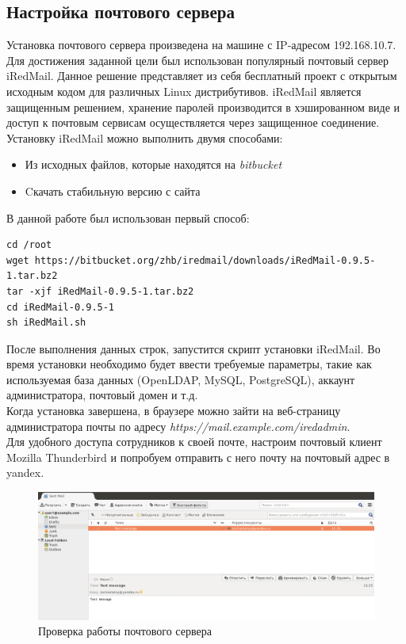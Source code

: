 \subsection{Настройка почтового сервера}
Установка почтового сервера произведена на машине с IP-адресом 192.168.10.7. Для достижения заданной цели был использован популярный почтовый сервер iRedMail. Данное решение представляет из себя бесплатный проект с открытым исходным кодом для различных Linux дистрибутивов. iRedMail является защищенным решением, хранение паролей производится в хэшированном виде и доступ к почтовым сервисам осуществляется через защищенное соединение.\\
Установку iRedMail можно выполнить двумя способами:
\begin{itemize}
	\item Из исходных файлов, которые находятся на \textit{bitbucket}
	\item Cкачать стабильную версию с сайта
\end{itemize}
В данной работе был использован первый способ:
\begin{lstlisting}
cd /root
wget https://bitbucket.org/zhb/iredmail/downloads/iRedMail-0.9.5-1.tar.bz2
tar -xjf iRedMail-0.9.5-1.tar.bz2
cd iRedMail-0.9.5-1
sh iRedMail.sh
\end{lstlisting}
После выполнения данных строк, запустится скрипт установки iRedMail. Во время установки необходимо будет ввести требуемые параметры, такие как используемая база данных (OpenLDAP, MySQL, PostgreSQL), аккаунт администратора, почтовый домен и т.д.\\
Когда установка завершена, в браузере можно зайти на веб-страницу администратора почты по адресу \textit{https://mail.example.com/iredadmin}.\\
Для удобного доступа сотрудников к своей почте, настроим почтовый клиент Mozilla Thunderbird и попробуем отправить с него почту на почтовый адрес в yandex.
\begin{figure}[H]
	\begin{center}
		\includegraphics[width=0.6\linewidth]{pics/mail}
		\caption{Проверка работы почтового сервера}
		\label{fig:mail}
	\end{center}
\end{figure}

